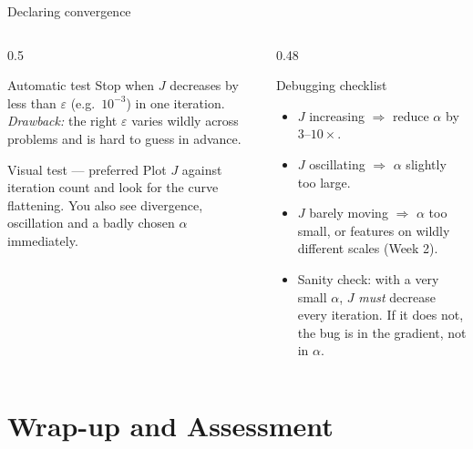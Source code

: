 \documentclass[aspectratio=169,11pt]{beamer}
\begin{document}
\begin{frame}{Declaring convergence}
  \small
  \begin{columns}[T,onlytextwidth]
    \begin{column}{0.5\textwidth}
      \begin{block}{Automatic test}
        Stop when $J$ decreases by less than $\varepsilon$ (e.g.\ $10^{-3}$) in one
        iteration.\\[3pt]
        \emph{Drawback:} the right $\varepsilon$ varies wildly across problems and
        is hard to guess in advance.
      \end{block}
      \begin{block}{Visual test --- preferred}
        Plot $J$ against iteration count and look for the curve flattening.
        You also see divergence, oscillation and a badly chosen $\alpha$
        immediately.
      \end{block}
    \end{column}
    \begin{column}{0.48\textwidth}
      \begin{block}{Debugging checklist}
        \begin{itemize}
          \item $J$ increasing $\Rightarrow$ reduce $\alpha$ by $3$--$10\times$.
          \item $J$ oscillating $\Rightarrow$ $\alpha$ slightly too large.
          \item $J$ barely moving $\Rightarrow$ $\alpha$ too small, or features on
                wildly different scales (Week 2).
          \item Sanity check: with a very small $\alpha$, $J$ \emph{must} decrease
                every iteration. If it does not, the bug is in the gradient, not
                in $\alpha$.
        \end{itemize}
      \end{block}
    \end{column}
  \end{columns}
\end{frame}

\section{Wrap-up and Assessment}
\end{document}
